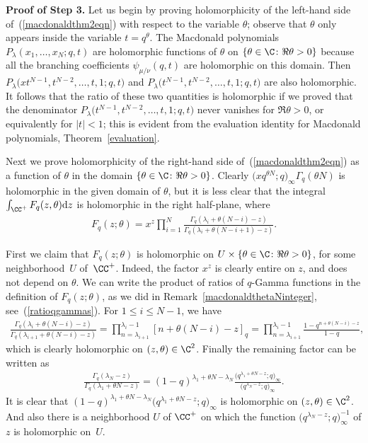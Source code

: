 \textbf{Proof of Step 3.} Let us begin by proving holomorphicity of the left-hand side of~(\ref{macdonaldthm2eqn}) with respect to the variable $\theta$; observe that $\theta$ only appears inside the variable $t = q^{\theta}$. The Macdonald polynomials $P_{\lambda}(x_1, \dots, x_N; q, t)$ are holomorphic functions of $\theta$ on $\{\theta\in\C\colon \Re\theta > 0\}$ because all the branching coef\/f\/icients $\psi_{\mu/\nu}(q, t)$ are holomorphic on this domain. Then $P_{\lambda}\big(xt^{N-1}, t^{N-2}, \dots, t, 1; q, t\big)$ and $P_{\lambda}\big(t^{N-1}, t^{N-2}, \dots, t, 1; q, t\big)$ are also holomorphic. It follows that the ratio of these two quantities is holomorphic if we proved that the denominator $P_{\lambda}\big(t^{N-1}, t^{N-2}, \dots, t, 1; q, t\big)$ never vanishes for $\Re\theta > 0$, or equivalently for $|t| < 1$; this is evident from the evaluation identity for Macdonald polynomials, Theorem~\ref{evaluation}.

Next we prove holomorphicity of the right-hand side of~(\ref{macdonaldthm2eqn}) as a function of $\theta$ in the domain $\{\theta\in\C\colon \Re\theta > 0\}$. Clearly $\big(xq^{\theta N}; q\big)_{\infty}\Gamma_q(\theta N)$ is holomorphic in the given domain of $\theta$, but it is less clear that the integral $\int_{\CC^+}{F_{q}(z, \theta){\rm d}z}$ is holomorphic in the right half-plane, where
\begin{gather*}
F_q(z; \theta) = x^z\prod\limits_{i=1}^N{\frac{\Gamma_q(\lambda_i + \theta(N-i) - z)}{\Gamma_q(\lambda_i + \theta(N-i+1) - z)}}.
\end{gather*}

First we claim that $F_q(z; \theta)$ is holomorphic on $U\times \{\theta\in\C\colon \Re\theta > 0\}$, for some neighborhood~$U$ of~$\CC^+$. Indeed, the factor $x^z$ is clearly entire on $z$, and does not depend on $\theta$. We can write the product of ratios of $q$-Gamma functions in the def\/inition of $F_q(z; \theta)$, as we did in Remark~\ref{macdonaldthetaNinteger}, see~(\ref{ratioqgammas}). For $1\leq i \leq N-1$, we have
\begin{gather*}
\frac{\Gamma_q(\lambda_i + \theta(N - i) - z)}{\Gamma_q(\lambda_{i+1} + \theta(N - i) - z)} =
\prod_{n = \lambda_{i+1}}^{\lambda_i - 1}{[n + \theta(N - i) - z]_q} =
\prod_{n = \lambda_{i+1}}^{\lambda_i - 1}{\frac{1 - q^{n + \theta(N - i) - z}}{1 - q}},
\end{gather*}
which is clearly holomorphic on $(z, \theta)\in\C^2$. Finally the remaining factor can be written as
\begin{gather*}
\frac{\Gamma_q(\lambda_N - z)}{\Gamma_q(\lambda_1 + \theta N - z)} = (1 - q)^{\lambda_1 + \theta N - \lambda_N}\frac{\big(q^{\lambda_1 + \theta N - z}; q\big)_{\infty}}{\big(q^{\lambda_N - z}; q\big)_{\infty}}.
\end{gather*}
It is clear that $(1 - q)^{\lambda_1 + \theta N - \lambda_N}\big(q^{\lambda_1 + \theta N - z}; q\big)_{\infty}$ is holomorphic on $(z, \theta)\in\C^2$. And also there is a neighborhood $U$ of $\CC^+$ on which the function $\big(q^{\lambda_N - z}; q\big)_{\infty}^{-1}$ of $z$ is holomorphic on~$U$.

